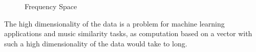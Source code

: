 \begin{figure}[htbp]
	\centering
	\begin{subfigure}{0.5\textwidth}
		\centering
		\label{laylaspec}
	\end{subfigure}%
	\begin{subfigure}{0.5\textwidth}
		\centering
		\label{laylaspecfft}
	\end{subfigure}
	\caption{Frequency Space}
	\label{fig:test}
\end{figure}
The high dimensionality of the data is a problem for machine learning applications and music similarity tasks, as computation based on a vector with such a high dimensionality of the data would take to long.
